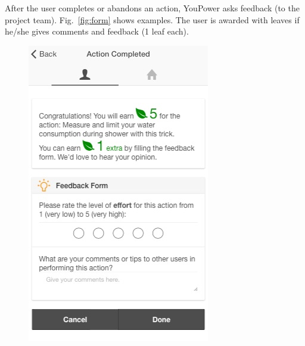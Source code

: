 \documentclass[a4paper]{article}
\begin{document}
After the user completes or abandons an action, YouPower asks feedback (to the project team). Fig.~\ref{fig:form} shows examples. The user is awarded with leaves if he/she gives comments and feedback (1 leaf each). 

\begin{figure}[t!]
      \begin{center}
        \begin{minipage}[t!]{0.3\linewidth}
	       \includegraphics[width=1\linewidth]{img/action_completed.jpg}
           \vspace{1.95cm}
        \end{minipage}

\end{center}
\end{figure}
\end{document}
